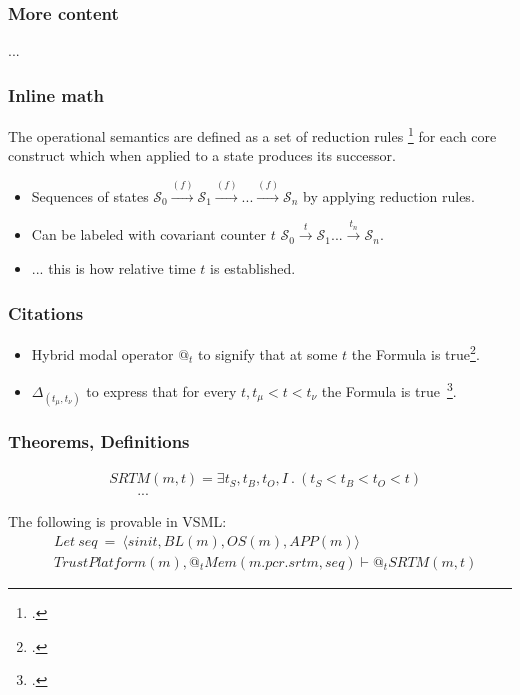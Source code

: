 \documentclass[aspectratio=169] {beamer}
\def\land{\mathbin\&}  %
\def\seq{\vdash}  %
\begin{document}
\begin{frame}\frametitle{More content}
...
\end{frame}


\begin{frame}\frametitle{Inline math}
The operational semantics are defined as a set of reduction rules \footcite{CCS,Milner1997,PICal} for each core construct which when applied to a state produces its successor.
\begin{itemize}
	\item Sequences of states $\mathcal{S}_{0} \xrightarrow{(f)} \mathcal{S}_{1} \xrightarrow{(f)} ... \xrightarrow{(f)} \mathcal{S}_{n}$ by applying reduction rules.
	\item Can be labeled with covariant counter $t$ $\mathcal{S}_{0} \xrightarrow{t} \mathcal{S}_{1} ... \xrightarrow{t_n} \mathcal{S}_{n}$. 
	\item ... this is how relative time $t$ is established.
\end{itemize}
\end{frame}

\begin{frame}\frametitle{Citations}
	\begin{itemize}
		\item Hybrid modal operator $@_t$ to signify that at some $t$ the Formula is true\footcite{Blackburn2000, Blackburn2006, Brauner2011}.
		\item $\Delta_{(t_{\mu},t_{\nu})}$ to express that for every $t, t_{\mu}<t<t_{\nu}$ the Formula is true~\footcite{Allen1983,Allen1984,Allen1989,Allen1994}.
	\end{itemize}
\end{frame}


\begin{frame}\frametitle{Theorems, Definitions}
\begin{definition}\label{def:srtm}
\small
\begin{align*}
  & SRTM(m,t) = \exists t_{S},t_{B},t_{O},I\ .\ (t_{S}<t_{B}<t_{O}<t)\\
  & \qquad ...
\end{align*}
\begin{theorem}\label{thm:srtm} 
The following is provable in VSML:
\begin{align*}
  &Let\ seq\ = \ \langle sinit,BL(m),OS(m),APP(m)\rangle\\
  &TrustPlatform(m), @_t Mem(m.pcr.srtm,seq) \seq @_t SRTM(m,t)
\end{align*}
\end{theorem}
\end{definition}
\end{frame}
\end{document}
